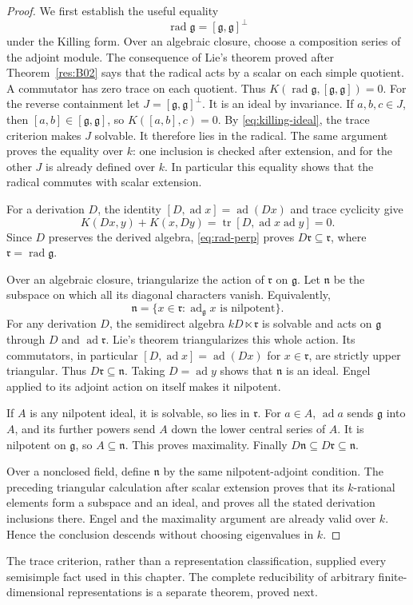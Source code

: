 \begin{proof}
We first establish the useful equality
\[
 \operatorname{rad}\mathfrak g
     =[\mathfrak g,\mathfrak g]^\perp
 \tag{2.6}\label{eq:rad-perp}
\]
under the Killing form. Over an algebraic closure,
choose a composition series of the adjoint module.
The consequence of Lie's theorem proved after
Theorem~\ref{res:B02} says that the radical acts
by a scalar on each simple quotient. A commutator
has zero trace on each quotient. Thus
\(K(\operatorname{rad}\mathfrak g,
[\mathfrak g,\mathfrak g])=0\).
For the reverse containment let
\(J=[\mathfrak g,\mathfrak g]^\perp\).
It is an ideal by invariance. If \(a,b,c\in J\),
then \([a,b]\in[\mathfrak g,\mathfrak g]\), so
\(K([a,b],c)=0\). By \eqref{eq:killing-ideal},
the trace criterion makes \(J\) solvable.
It therefore lies in the radical.
The same argument proves the equality over \(k\):
one inclusion is checked after extension, and for
the other \(J\) is already defined over \(k\).
In particular this equality shows that the radical
commutes with scalar extension.

For a derivation \(D\), the identity
\([D,\operatorname{ad}x]=\operatorname{ad}(Dx)\)
and trace cyclicity give
\[
 K(Dx,y)+K(x,Dy)=
 \operatorname{tr}[D,\operatorname{ad}x\operatorname{ad}y]=0.
\]
Since \(D\) preserves the derived algebra,
\eqref{eq:rad-perp} proves \(D\mathfrak r\subseteq\mathfrak r\),
where \(\mathfrak r=\operatorname{rad}\mathfrak g\).

Over an algebraic closure, triangularize the action of
\(\mathfrak r\) on \(\mathfrak g\). Let \(\mathfrak n\)
be the subspace on which all its diagonal characters
vanish. Equivalently,
\[
 \mathfrak n=\{x\in\mathfrak r:
             \operatorname{ad}_{\mathfrak g}x
             \text{ is nilpotent}\}.
\]
For any derivation \(D\), the semidirect algebra
\(kD\ltimes\mathfrak r\) is solvable and acts on
\(\mathfrak g\) through \(D\) and
\(\operatorname{ad}\mathfrak r\). Lie's theorem
triangularizes this whole action. Its commutators,
in particular
\([D,\operatorname{ad}x]=\operatorname{ad}(Dx)\)
for \(x\in\mathfrak r\), are strictly upper
triangular. Thus \(D\mathfrak r\subseteq\mathfrak n\).
Taking \(D=\operatorname{ad}y\) shows that
\(\mathfrak n\) is an ideal. Engel applied to its
adjoint action on itself makes it nilpotent.

If \(A\) is any nilpotent ideal, it is solvable,
so lies in \(\mathfrak r\). For \(a\in A\),
\(\operatorname{ad}a\) sends \(\mathfrak g\) into
\(A\), and its further powers send \(A\) down
the lower central series of \(A\).
It is nilpotent on \(\mathfrak g\), so \(A\subseteq
\mathfrak n\). This proves maximality.
Finally \(D\mathfrak n\subseteq D\mathfrak r
\subseteq\mathfrak n\).

Over a nonclosed field, define \(\mathfrak n\) by
the same nilpotent-adjoint condition. The preceding
triangular calculation after scalar extension proves
that its \(k\)-rational elements form a subspace and
an ideal, and proves all the stated derivation
inclusions there. Engel and the maximality argument
are already valid over \(k\). Hence the conclusion
descends without choosing eigenvalues in \(k\).
\end{proof}

The trace criterion, rather than a representation
classification, supplied every semisimple fact used
in this chapter. The complete reducibility of arbitrary
finite-dimensional representations is a separate
theorem, proved next.
